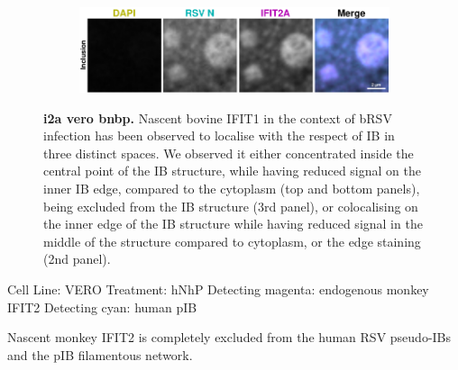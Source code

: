 \begin{figure}
\begin{subfigure}{0.5\textwidth}
    \end{subfigure}
    \begin{subfigure}{1\textwidth}
        \caption{}
        \includegraphics[width=1\linewidth]{10. Chapter 5/Figs/02. pIB/02. IFIT2A/09. i2a-vero-bnbp.pdf} 
    \end{subfigure}
    \caption[i2a vero bnbp]{\textbf{i2a vero bnbp.} Nascent bovine IFIT1 in the context of bRSV infection has been observed to localise with the respect of IB in three distinct spaces. We observed it either concentrated inside the central point of the IB structure, while having reduced signal on the inner IB edge, compared to the cytoplasm (top and bottom panels), being excluded from the IB structure (3rd panel), or colocalising on the inner edge of the IB structure while having reduced signal in the middle of the structure compared to cytoplasm, or the edge staining (2nd panel).}
    \label{fig:i2a vero bnbp}
\end{figure}

Cell Line: VERO \newline
Treatment: hNhP \newline
Detecting magenta: endogenous monkey IFIT2 \newline
Detecting cyan: human pIB \newline

Nascent monkey IFIT2 is completely excluded from the human RSV pseudo-IBs and the pIB filamentous network.

